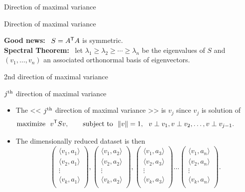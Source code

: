\documentclass{beamer}
\begin{document}
\begin{frame}[t]{Direction of maximal variance}
	\grid
	\pause

\end{frame}
\begin{frame}[t]{Direction of maximal variance}
	\grid

	\textbf{Good news:} \ $S = A^{{\sf T}} A$ is symmetric.
	\\

	\textbf{Spectral Theorem:} \ let $\lambda_1 \geq \lambda_2 \geq \cdots \geq \lambda_n$ be the eigenvalues of $S$ and $(v_1, \dots, v_n)$ an associated orthonormal basis of eigenvectors.

\end{frame}
\begin{frame}[t]{2nd direction of maximal variance}
	\grid

\end{frame}
\begin{frame}[t]{$j^{\rm th}$ direction of maximal variance}
	\grid

	\begin{itemize}
		\item The << $j^{\rm th}$ direction of maximal variance >> is $v_j$ since $v_j$ is solution of
			\vspace{0.3cm}
$$
			\hspace{-1cm}
\text{maximize} \ \ v^{\sT} S v, \qquad \text{subject to} \ \ \|v\| = 1, \ \ v \perp v_1, v \perp v_2, \dots, v \perp v_{j-1}.
$$
\vspace{0.1cm}
\item The dimensionally reduced dataset is then
$$
\begin{pmatrix}
	\langle v_1, a_1 \rangle \\
	\langle v_2, a_1 \rangle \\
	\vdots \\
	\langle v_k, a_1 \rangle \\
\end{pmatrix}
,
\begin{pmatrix}
	\langle v_1, a_2 \rangle \\
	\langle v_2, a_2 \rangle \\
	\vdots \\
	\langle v_k, a_2 \rangle \\
\end{pmatrix}
,
\begin{pmatrix}
	\langle v_1, a_3 \rangle \\
	\langle v_2, a_3 \rangle \\
	\vdots \\
	\langle v_k, a_3 \rangle \\
\end{pmatrix}
\dots
\begin{pmatrix}
	\langle v_1, a_n \rangle \\
	\langle v_2, a_n \rangle \\
	\vdots \\
	\langle v_k, a_n \rangle \\
\end{pmatrix}.
$$
	\end{itemize}
\end{frame}
\end{document}
